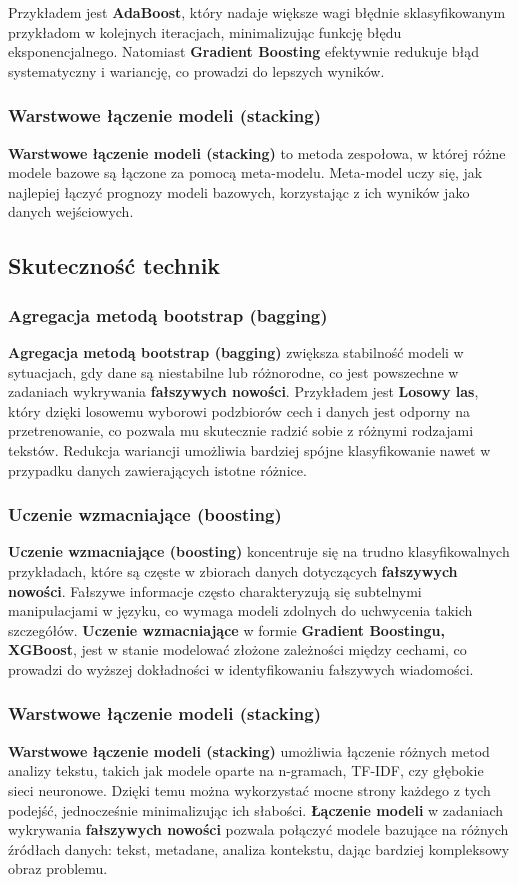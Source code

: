 Przykładem jest \textbf{AdaBoost}, który nadaje większe wagi błędnie
sklasyfikowanym przykładom w kolejnych iteracjach, minimalizując funkcję
błędu eksponencjalnego. Natomiast \textbf{Gradient Boosting} efektywnie redukuje błąd systematyczny i wariancję, co
prowadzi do lepszych wyników.

\subsubsection{Warstwowe łączenie modeli (stacking)}
\textbf{Warstwowe łączenie modeli (stacking)} to metoda zespołowa, w której różne modele bazowe są
łączone za pomocą meta-modelu. Meta-model uczy się, jak najlepiej łączyć
prognozy modeli bazowych, korzystając z ich wyników jako danych
wejściowych.

\subsection{Skuteczność technik}
\subsubsection{Agregacja metodą bootstrap (bagging)}
\textbf{Agregacja metodą bootstrap (bagging)} zwiększa stabilność modeli w sytuacjach, gdy dane są niestabilne
lub różnorodne, co jest powszechne w zadaniach wykrywania \textbf{fałszywych nowości}.
Przykładem jest \textbf{Losowy las}, który dzięki losowemu wyborowi podzbiorów
cech i danych jest odporny na przetrenowanie, co pozwala mu skutecznie
radzić sobie z różnymi rodzajami tekstów. Redukcja wariancji umożliwia bardziej spójne
klasyfikowanie nawet w przypadku danych zawierających istotne różnice.

\subsubsection{Uczenie wzmacniające (boosting)}
\textbf{Uczenie wzmacniające (boosting)} koncentruje się na trudno klasyfikowalnych przykładach, które
są częste w zbiorach danych dotyczących \textbf{fałszywych nowości}. Fałszywe informacje
często charakteryzują się subtelnymi manipulacjami w języku, co wymaga
modeli zdolnych do uchwycenia takich szczegółów. \textbf{Uczenie wzmacniające} w formie
\textbf{Gradient Boostingu, XGBoost}, jest w stanie modelować złożone
zależności między cechami, co prowadzi do wyższej dokładności w
identyfikowaniu fałszywych wiadomości.

\subsubsection{Warstwowe łączenie modeli (stacking)}
\textbf{Warstwowe łączenie modeli (stacking)} umożliwia łączenie różnych metod analizy tekstu, takich jak
modele oparte na n-gramach, TF-IDF, czy głębokie sieci neuronowe. Dzięki
temu można wykorzystać mocne strony każdego z tych podejść, jednocześnie
minimalizując ich słabości. \textbf{Łączenie modeli} w zadaniach wykrywania \textbf{fałszywych nowości}
pozwala połączyć modele bazujące na różnych źródłach danych: tekst,
metadane, analiza kontekstu, dając bardziej kompleksowy obraz
problemu.

